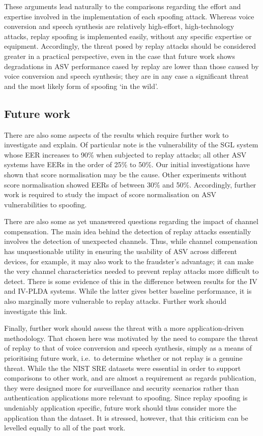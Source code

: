 These arguments lead naturally to the comparisons regarding the effort and expertise involved in the implementation of each spoofing attack.  Whereas voice conversion and speech synthesis are relatively high-effort, high-technology attacks, replay spoofing is implemented easily, without any specific expertise or equipment.  Accordingly, the threat posed by replay attacks should be considered greater in a practical perspective, even in the case that future work shows degradations in ASV performance cased by replay are lower than those caused by voice conversion and speech synthesis; they are in any case a significant threat and the most likely form of spoofing `in the wild'.



\subsection{Future work}

There are also some aspects of the results which require further work to investigate and explain.  Of particular note is the vulnerability of the SGL system whose EER increases to 90\% when subjected to replay attacks; all other ASV systems have EERs in the order of 25\% to 50\%.  Our initial investigations have shown that score normalisation may be the cause.  Other experiments without score normalisation showed EERs of between 30\% and 50\%.  Accordingly, further work is required to study the impact of score normalisation on ASV vulnerabilities to spoofing. 

There are also some as yet unanswered questions regarding the impact of channel compensation.  The main idea behind the detection of replay attacks essentially involves the detection of unexpected channels.  Thus, while channel compensation has unquestionable utility in ensuring the usability of ASV across different devices, for example, it may also work to the fraudster's advantage; it can make the very channel characteristics needed to prevent replay attacks more difficult to detect.  There is some evidence of this in the difference between results for the IV and IV-PLDA systems.  While the latter gives better baseline performance, it is also marginally more vulnerable to replay attacks.  Further work should investigate this link.

Finally, further work should assess the threat with a more application-driven methodology.  That chosen here was motivated by the need to compare the threat of replay to that of voice conversion and speech synthesis, simply as a means of prioritising future work, i.e.\ to determine whether or not replay is a genuine threat.  While the the NIST SRE datasets were essential in order to support comparisons to other work, and are almost a requirement as regards publication, they were designed more for surveillance and security scenarios rather than authentication applications more relevant to spoofing.  Since replay spoofing is undeniably application specific, future work should thus consider more the application than the dataset.  It is stressed, however, that this criticism can be levelled equally to all of the past work.
